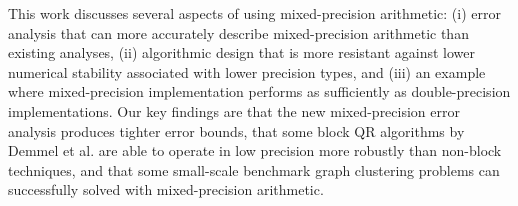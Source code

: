 This work discusses several aspects of using mixed-precision arithmetic: (i) error analysis that can more accurately describe mixed-precision arithmetic than existing analyses, (ii) algorithmic design that is more resistant against lower numerical stability associated with lower precision types, and (iii) an example where mixed-precision implementation performs as sufficiently as double-precision implementations. 
Our key findings are that the new mixed-precision error analysis produces tighter error bounds, that some block QR algorithms by Demmel et al. \cite{Demmel2012} are able to operate in low precision more robustly than non-block techniques, and that some small-scale benchmark graph clustering problems can successfully solved with mixed-precision arithmetic.

